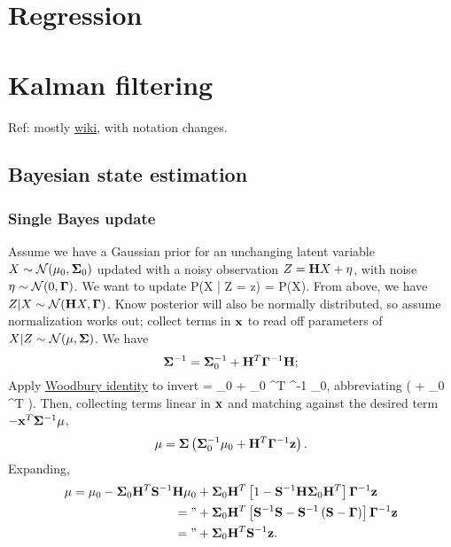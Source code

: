\documentclass[notitlepage,openany,11pt]{report}
\theoremstyle{plain}%
\numberwithin{equation}{section}
\begin{document}
\section{Regression}



\section{Kalman filtering}
Ref: mostly \href{https://en.wikipedia.org/wiki/Kalman_filter}{wiki}, with notation changes.

\subsection{Bayesian state estimation}
\label{sec-bayesian-state-estimation}

\subsubsection{Single Bayes update}

Assume we have a Gaussian prior for an unchanging latent variable $X \sim \mathcal{N}(\mathbf{\mu}_0, \mathbf{\Sigma}_0)$ updated with a noisy observation $Z = \mathbf{H}X + \mathbf{\eta}$, with noise $\eta \sim \mathcal{N}(0, \mathbf{\Gamma})$. We want to update
\be
P(X | Z = z) =  P(X).
\ee
From above, we have $Z | X \sim \mathcal{N}(\mathbf{H}X, \mathbf{\Gamma})$. Know posterior will also be normally distributed, so assume normalization works out; collect terms in $\mathbf{x}$ to read off parameters of $X | Z \sim \mathcal{N}(\mathbf{\mu}, \mathbf{\Sigma})$. We have
\begin{equation}
\label{eq-kal-1}
\mathbf{\Sigma}^{-1} = \mathbf{\Sigma}_0^{-1} + \mathbf{H}^{T} \mathbf{\Gamma}^{-1} \mathbf{H};
\end{equation}
Apply \href{https://en.wikipedia.org/wiki/Woodbury_matrix_identity}{Woodbury identity} to invert
\be
\mbf{\Sigma} = \mbf{\Sigma}_0 + \mbf{\Sigma}_0 ^{T} ^{-1}  \mbf{\Sigma}_0,
\ee
abbreviating
\be
{} \equiv \left( \mbf{\Gamma} +  \mbf{\Sigma}_{0} ^{T} \right).
\ee
Then, collecting terms linear in $\mathbf{x}$ and matching against the desired term $- \mathbf{x}^{T} \mathbf{\Sigma}^{-1} \mathbf{\mu}$,
\begin{equation}
\label{eq-kal-2}
\mathbf{\mu} = \mathbf{\Sigma}\left( \mathbf{\Sigma}_0^{-1} \mathbf{\mu}_{0} + \mathbf{H}^{T} \mathbf{\Gamma}^{-1}\mathbf{z} \right).
\end{equation}
Expanding,
\begin{align*}
\mathbf{\mu} = \mathbf{\mu}_0 - \mathbf{\Sigma}_0 \mathbf{H}^{T} \mathbf{S}^{-1} \mathbf{H} \mathbf{\mu}_0 &+ \mathbf{\Sigma}_0 \mathbf{H}^{T} \left[ 1 - \mathbf{S}^{-1} \mathbf{H} \mathbf{\Sigma}_{0} \mathbf{H}^{T} \right] \mathbf{\Gamma}^{-1} \mathbf{z} \\
 = \text{''} &+ \mathbf{\Sigma}_0 \mathbf{H}^{T} \left[ \mathbf{S}^{-1} \mathbf{S} - \mathbf{S}^{-1} \left( \mathbf{S} - \mathbf{\Gamma} \right) \right] \mathbf{\Gamma}^{-1} \mathbf{z} \\
  = \text{''} &+ \mathbf{\Sigma}_0 \mathbf{H}^{T} \mathbf{S}^{-1} \mathbf{z}.
\end{align*}
\end{document}
